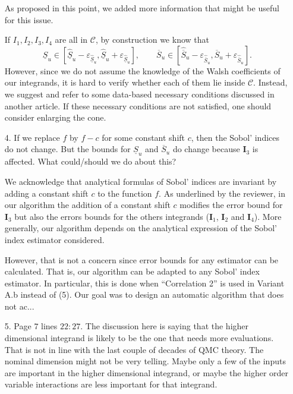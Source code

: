 \documentclass[10pt,a4paper]{article}
\newcommand{\vect}[1]{\boldsymbol{\mathbf{#1}}}
\newcommand{\vI}{\vect{I}}
\newcommand{\answer}[1]{{\color{blue} #1 }}
\begin{document}
\begin{itemize}
\answer{
As proposed in this point, we added more information that might be useful for this issue.

If $I_1, I_2, I_3, I_4$ are all in $\mathcal{C}$, by construction we know that
\[ \underline{S}_u\in \left[ \widehat{\underline{S}}_u - \varepsilon_{\widehat{\underline{S}}_u}, \widehat{\underline{S}}_u + \varepsilon_{\widehat{\underline{S}}_u} \right], \qquad \overline{S}_u\in \left[ \widehat{\overline{S}}_u - \varepsilon_{\widehat{\overline{S}}_u}, \widehat{\overline{S}}_u + \varepsilon_{\widehat{\overline{S}}_u} \right] .\]
However, since we do not assume the knowledge of the Walsh coefficients of our integrands, it is hard to verify whether each of them lie inside $\mathcal{C}$. Instead, we suggest and refer to some data-based necessary conditions discussed in another article. If these necessary conditions are not satisfied, one should consider enlarging the cone.}

\item[4.]If we replace $f$ by $f-c$ for some constant shift $c$, then the Sobol' indices do not change. But the bounds for $\underline{S}_u$ and $\overline{S}_u$ do change because $\vI_3$ is affected. What could/should we do about this?

{\color {blue} We acknowledge that analytical formulas of Sobol' indices are invariant by adding a constant shift $c$ to the function $f$. As underlined by the reviewer, in our algorithm the addition of a constant shift $c$ modifies the error bound for $\vI_3$ but also the errors bounds for the others integrands ($\vI_1$, $\vI_2$ and $\vI_4$). More generally, our algorithm depends on the analytical expression of the Sobol' index estimator considered.

However, that is not a concern since error bounds for any estimator can be calculated. That is, our algorithm can be adapted to any Sobol' index estimator. In particular, this is done when ``Correlation 2'' is used in Variant A.b instead of (5). Our goal was to design an automatic algorithm that does not ac...}


\item[5.] Page $7$ lines $22:27$. The discussion here is saying that the higher dimensional integrand is likely to be the one that needs more evaluations. That is not in line with the last couple of decades of QMC theory. The nominal dimension might not be very telling. Maybe only a few of the inputs are important in the higher dimensional integrand, or maybe the higher order variable interactions are less important for that integrand.


\end{itemize}
\end{document}
